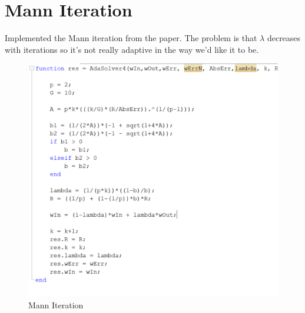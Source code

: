 \documentclass[11pt, a4paper]{article}
\theoremstyle{definition}
\begin{document}
	\section{Mann Iteration}
Implemented the Mann iteration from the paper. The problem is that $\lambda$ decreases with iterations so it's not really adaptive in the way we'd like it to be.
	
	\begin{figure}[h]
		\centering
		\includegraphics[scale=0.8]{Ada.png}
		\caption{Mann Iteration} 
		\label{F2}
	\end{figure}
	
	
\end{document}
